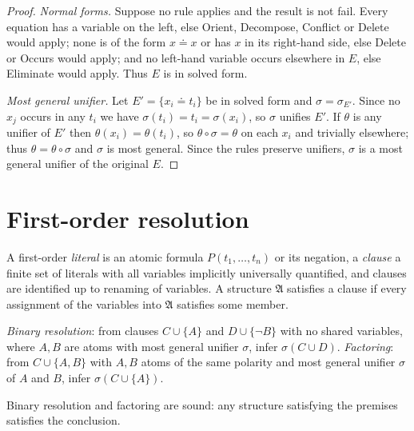 \begin{proof}
\emph{Normal forms.} Suppose no rule applies and the result is not \textsf{fail}. Every equation has a variable on the left, else \textsf{Orient}, \textsf{Decompose}, \textsf{Conflict} or \textsf{Delete} would apply; none is of the form $x\doteq x$ or has $x$ in its right-hand side, else \textsf{Delete} or \textsf{Occurs} would apply; and no left-hand variable occurs elsewhere in $E$, else \textsf{Eliminate} would apply. Thus $E$ is in solved form.

\emph{Most general unifier.} Let $E'=\{x_i\doteq t_i\}$ be in solved form and $\sigma=\sigma_{E'}$. Since no $x_j$ occurs in any $t_i$ we have $\sigma(t_i)=t_i=\sigma(x_i)$, so $\sigma$ unifies $E'$. If $\theta$ is any unifier of $E'$ then $\theta(x_i)=\theta(t_i)$, so $\theta\circ\sigma=\theta$ on each $x_i$ and trivially elsewhere; thus $\theta=\theta\circ\sigma$ and $\sigma$ is most general. Since the rules preserve unifiers, $\sigma$ is a most general unifier of the original $E$.
\end{proof}

\section{First-order resolution}
\label{sec:fo-res}

A first-order \emph{literal} is an atomic formula $P(t_1,\dots,t_n)$ or its negation, a \emph{clause} a finite set of literals with all variables implicitly universally quantified, and clauses are identified up to renaming of variables. A structure $\mathfrak{A}$ satisfies a clause if every assignment of the variables into $\mathfrak{A}$ satisfies some member.

\begin{definition}
\label{def:fo-res}
\emph{Binary resolution}: from clauses $C\cup\{A\}$ and $D\cup\{\neg B\}$ with no shared variables, where $A,B$ are atoms with most general unifier $\sigma$, infer $\sigma(C\cup D)$. \emph{Factoring}: from $C\cup\{A,B\}$ with $A,B$ atoms of the same polarity and most general unifier $\sigma$ of $A$ and $B$, infer $\sigma(C\cup\{A\})$.
\end{definition}

\begin{proposition}[Soundness]
\label{prop:fo-res-sound}
Binary resolution and factoring are sound: any structure satisfying the premises satisfies the conclusion.
\end{proposition}

